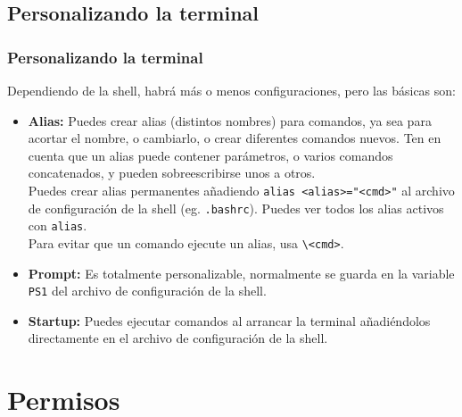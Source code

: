 \documentclass[aspectratio=43]{beamer}
\begin{document}
\begin{frame}
\end{frame}




\subsection{Personalizando la terminal}

\begin{frame}
    \frametitle{Personalizando la terminal}
    Dependiendo de la shell, habrá más o menos configuraciones, pero las básicas son:

    \begin{itemize}
        \item \textbf{Alias:} Puedes crear alias (distintos nombres) para comandos, ya sea para acortar el nombre, o cambiarlo, o crear diferentes comandos nuevos. Ten en cuenta que un alias puede contener parámetros, o varios comandos concatenados, y pueden sobreescribirse unos a otros.\\
        Puedes crear alias permanentes añadiendo \texttt{alias <alias>="<cmd>"} al archivo de configuración de la shell (eg. \texttt{.bashrc}). Puedes ver todos los alias activos con \texttt{alias}.\\
        Para evitar que un comando ejecute un alias, usa \texttt{\textbackslash<cmd>}.\\
        \item \textbf{Prompt:} Es totalmente personalizable, normalmente se guarda en la variable \texttt{PS1} del archivo de configuración de la shell.
        \item \textbf{Startup:} Puedes ejecutar comandos al arrancar la terminal añadiéndolos directamente en el archivo de configuración de la shell.
    \end{itemize}

\end{frame}



\section{Permisos}
\end{document}

